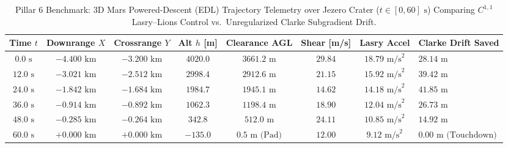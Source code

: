 \documentclass[11pt,a4paper,reqno]{article}
\theoremstyle{plain}
\theoremstyle{definition}
\theoremstyle{remark}
\numberwithin{equation}{section}
\begin{document}
\begin{table}[H]
\centering
\scriptsize
\caption{Pillar 6 Benchmark: 3D Mars Powered-Descent (EDL) Trajectory Telemetry over Jezero Crater ($t \in [0, 60]\text{ s}$) Comparing $C^{1,1}$ Lasry--Lions Control vs.\ Unregularized Clarke Subgradient Drift.}
\label{tab:mars_edl_trajectory}
\begin{tabularx}{\textwidth}{c c c c c c c >{\raggedright\arraybackslash}X}
\toprule
\textbf{Time $t$} & \textbf{Downrange $X$} & \textbf{Crossrange $Y$} & \textbf{Alt $h$ [m]} & \textbf{Clearance AGL} & \textbf{Shear [m/s]} & \textbf{Lasry Accel} & \textbf{Clarke Drift Saved} \\
\midrule
$0.0\text{ s}$  & $-4.400\text{ km}$ & $-3.200\text{ km}$ & $4020.0$ & $3661.2\text{ m}$ & $29.84$ & $18.79\text{ m/s}^2$ & $28.14\text{ m}$ \\
$12.0\text{ s}$ & $-3.021\text{ km}$ & $-2.512\text{ km}$ & $2998.4$ & $2912.6\text{ m}$ & $21.15$ & $15.92\text{ m/s}^2$ & $39.42\text{ m}$ \\
$24.0\text{ s}$ & $-1.842\text{ km}$ & $-1.684\text{ km}$ & $1984.7$ & $1945.1\text{ m}$ & $14.62$ & $14.18\text{ m/s}^2$ & $41.85\text{ m}$ \\
$36.0\text{ s}$ & $-0.914\text{ km}$ & $-0.892\text{ km}$ & $1062.3$ & $1198.4\text{ m}$ & $18.90$ & $12.04\text{ m/s}^2$ & $26.73\text{ m}$ \\
$48.0\text{ s}$ & $-0.285\text{ km}$ & $-0.264\text{ km}$ & $342.8$  & $512.0\text{ m}$  & $24.11$ & $10.85\text{ m/s}^2$ & $14.92\text{ m}$ \\
$60.0\text{ s}$ & $+0.000\text{ km}$ & $+0.000\text{ km}$ & $-135.0$ & $0.5\text{ m (Pad)}$ & $12.00$ & $9.12\text{ m/s}^2$  & $0.00\text{ m (Touchdown)}$ \\
\bottomrule
\end{tabularx}
\end{table}
\end{document}
